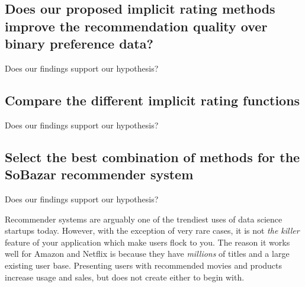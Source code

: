 

\subsection{Does our proposed implicit rating methods improve the recommendation quality over binary preference data?}

Does our findings support our hypothesis?



\subsection{Compare the different implicit rating functions}

Does our findings support our hypothesis?

\subsection{Select the best combination of methods for the SoBazar recommender system}

Does our findings support our hypothesis?












Recommender systems are arguably one of the trendiest uses of data science startups today. However, with the exception of very
rare cases, it is not \emph{the killer} feature of your application which make users flock to you. The reason it works
well for Amazon and Netflix is because they have \emph{millions} of titles and a large existing user base. Presenting users
with recommended movies and products increase usage and sales, but does not create either to begin with.

